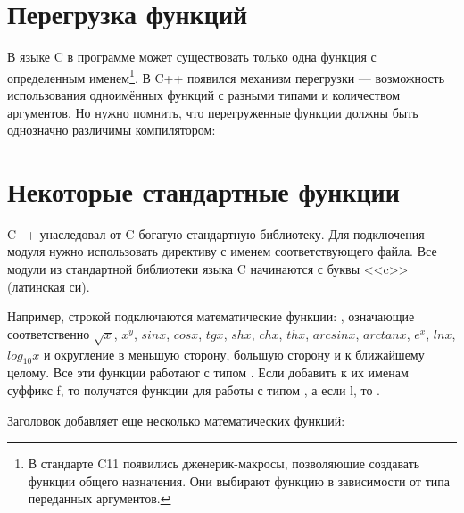 \documentclass[book.tex]{subfiles}
\begin{document}

\section*{Перегрузка функций}

В языке C в программе может существовать только одна функция с определенным именем\footnote{В стандарте C11 появились дженерик-макросы, позволяющие создавать функции общего назначения. Они выбирают функцию в зависимости от типа переданных аргументов.}. В C++ появился механизм перегрузки --- возможность использования одноимённых функций с разными типами и количеством аргументов. Но нужно помнить, что перегруженные функции должны быть однозначно различимы компилятором:


\section*{Некоторые стандартные функции}

C++ унаследовал от C богатую стандартную библиотеку. Для подключения модуля нужно использовать директиву  с именем соответствующего файла. Все модули из стандартной библиотеки языка C начинаются с буквы <<c>> (латинская си).

Например, строкой  подключаются математические функции: , означающие соответственно $\sqrt x$, $x^y$, $sin x$, $cos x$, $tg x$, $sh x$, $ch x$, $th x$, $arcsin x$, $arctan x$, $e^x$, $ln x$, $log_{10}x$ и округление в меньшую сторону, большую сторону и к ближайшему целому. Все эти функции работают с типом . Если добавить к их именам суффикс f, то получатся функции для работы с типом , а если l, то .

Заголовок  добавляет еще несколько математических функций:
\end{document}
